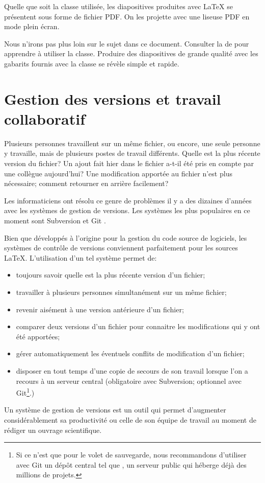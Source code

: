 Quelle que soit la classe utilisée, les diapositives produites avec
{\LaTeX} se présentent sous forme de fichier PDF. On les projette avec
une liseuse PDF en mode plein écran.

Nous n'irons pas plus loin sur le sujet dans ce document. Consulter
la %
de  pour apprendre à utiliser la classe. Produire des
diapositives de grande qualité avec les gabarits fournis avec la
classe se révèle simple et rapide.



\section{Gestion des versions et travail collaboratif}
\label{sec:trucs:cvs}

Plusieurs personnes travaillent sur un même fichier, ou encore, une
seule personne y travaille, mais de plusieurs postes de travail
différents. Quelle est la plus récente version du fichier? Un ajout
fait hier dans le fichier a-t-il été pris en compte par une collègue
aujourd'hui? Une modification apportée au fichier n'est plus
nécessaire; comment retourner en arrière facilement?

Les informaticiens ont résolu ce genre de problèmes il y a des
dizaines d'années avec les systèmes de gestion de versions. Les
systèmes les plus populaires en ce moment sont Subversion
\citep{subversion} et Git \citep{git}.

Bien que développés à l'origine pour la gestion du code source de
logiciels, les systèmes de contrôle de versions conviennent
parfaitement pour les sources {\LaTeX}. L'utilisation d'un tel système
permet de:
\begin{itemize}
\item toujours savoir quelle est la plus récente version d'un fichier;
\item travailler à plusieurs personnes simultanément sur un même
  fichier;
\item revenir aisément à une version antérieure d'un fichier;
\item comparer deux versions d'un fichier pour connaitre les
  modifications qui y ont été apportées;
\item gérer automatiquement les éventuels conflits de modification
  d'un fichier;
\item disposer en tout temps d'une copie de secours de son travail
  lorsque l'on a recours à un serveur central (obligatoire avec
  Subversion; optionnel avec Git\footnote{%
    Si ce n'est que pour le volet de sauvegarde, nous recommandons
    d'utiliser avec Git un dépôt central tel que
    , un serveur public qui héberge
    déjà des millions de projets.}.)
\end{itemize}
Un système de gestion de versions est un outil qui permet d'augmenter
considérablement sa productivité ou celle de son équipe de
travail au moment de rédiger un ouvrage scientifique.

